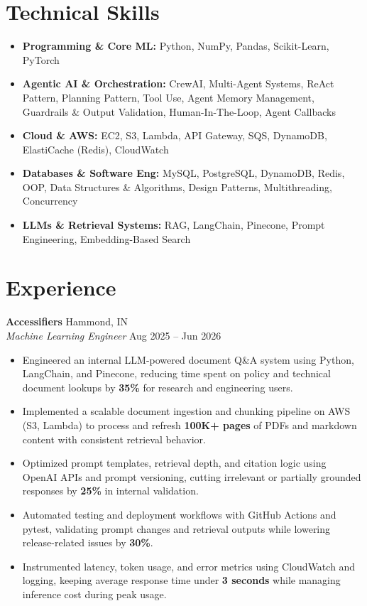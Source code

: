 \documentclass[10pt, letterpaper]{article}
\begin{document}
\section{Technical Skills}
\begin{itemize}[leftmargin=0.15in, label={}]
    \item \textbf{Programming \& Core ML:} Python, NumPy, Pandas, Scikit-Learn, PyTorch
    \item \textbf{Agentic AI \& Orchestration:} CrewAI, Multi-Agent Systems, ReAct Pattern, Planning Pattern, Tool Use, Agent Memory Management, Guardrails \& Output Validation, Human-In-The-Loop, Agent Callbacks
    \item \textbf{Cloud \& AWS:} EC2, S3, Lambda, API Gateway, SQS, DynamoDB, ElastiCache (Redis), CloudWatch
    \item \textbf{Databases \& Software Eng:} MySQL, PostgreSQL, DynamoDB, Redis, OOP, Data Structures \& Algorithms, Design Patterns, Multithreading, Concurrency
    \item \textbf{LLMs \& Retrieval Systems:} RAG, LangChain, Pinecone, Prompt Engineering, Embedding-Based Search
\end{itemize}

\section{Experience}
\textbf{Accessifiers} \hfill Hammond, IN \\
\textit{Machine Learning Engineer} \hfill Aug 2025 -- Jun 2026
\begin{itemize}
    \item Engineered an internal LLM-powered document Q\&A system using Python, LangChain, and Pinecone, reducing time spent on policy and technical document lookups by \textbf{35\%} for research and engineering users.
    \item Implemented a scalable document ingestion and chunking pipeline on AWS (S3, Lambda) to process and refresh \textbf{100K+ pages} of PDFs and markdown content with consistent retrieval behavior.
    \item Optimized prompt templates, retrieval depth, and citation logic using OpenAI APIs and prompt versioning, cutting irrelevant or partially grounded responses by \textbf{25\%} in internal validation.
    \item Automated testing and deployment workflows with GitHub Actions and pytest, validating prompt changes and retrieval outputs while lowering release-related issues by \textbf{30\%}.
    \item Instrumented latency, token usage, and error metrics using CloudWatch and logging, keeping average response time under \textbf{3 seconds} while managing inference cost during peak usage.
\end{itemize}
\end{document}
